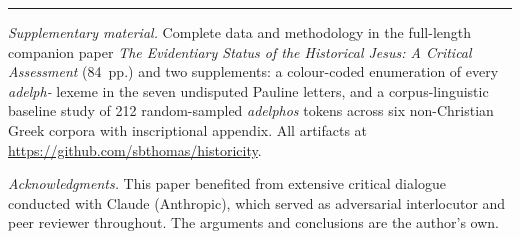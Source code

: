 \documentclass[12pt,oneside]{article}
\newcommand{\grk}[1]{\textit{#1}}
\begin{document}
\vspace{1em}

\noindent\rule{0.4\textwidth}{0.4pt}\par
\vspace{0.5em}
\small\noindent\textit{Supplementary material.}  Complete data and
methodology in the full-length companion paper \textit{The
Evidentiary Status of the Historical Jesus: A Critical Assessment}
(84~pp.) and two supplements: a colour-coded enumeration of every
\grk{adelph-} lexeme in the seven undisputed Pauline letters, and
a corpus-linguistic baseline study of 212 random-sampled
\grk{adelphos} tokens across six non-Christian Greek corpora with
inscriptional appendix.  All artifacts at
\url{https://github.com/sbthomas/historicity}.

\noindent\textit{Acknowledgments.}  This paper benefited from
extensive critical dialogue conducted with Claude (Anthropic),
which served as adversarial interlocutor and peer reviewer
throughout.  The arguments and conclusions are the author's own.


\end{document}
